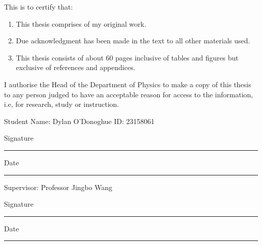 This is to certify that:

\begin{enumerate}

    \item This thesis comprises of my original work.

    \item  Due acknowledgment has been made in the text to all other materials used.

    \item This thesis consists of about 60 pages inclusive of tables and figures but exclusive of references and appendices.
\end{enumerate}

I authorise the Head of the Department of Physics to make a copy of this thesis to any person judged to have an acceptable reason for access to the information, i.e, for research, study or instruction.

Student Name: Dylan O'Donoghue \;\;\; ID: 23158061

Signature
\vspace{4mm}
\hrule

\vspace{5mm}
Date
\vspace{4mm}
\hrule

\vspace{10mm}
Supervisor: Professor Jingbo Wang

Signature
\vspace{4mm}
\hrule

\vspace{5mm}
Date
\vspace{4mm}
\hrule
